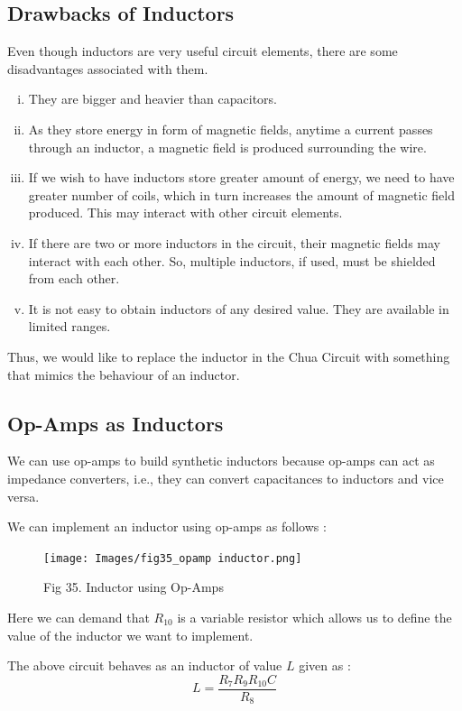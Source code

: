 \documentclass[12pt]{article}
\begin{document}
\subsection{Drawbacks of Inductors}
Even though inductors are very useful circuit elements, there are some disadvantages associated with them. 
\begin{enumerate}[i.]
	\item They are bigger and heavier than capacitors.
	\item As they store energy in form of magnetic fields, anytime a current passes through an inductor, a magnetic field is produced surrounding the wire.
	\item If we wish to have inductors store greater amount of energy, we need to have greater number of coils, which in turn increases the amount of magnetic field produced. This may interact with other circuit elements.
	\item If there are two or more inductors in the circuit, their magnetic fields may interact with each other. So, multiple inductors, if used, must be shielded from each other. 
	\item It is not easy to obtain inductors of any desired value. They are available in limited ranges.
\end{enumerate}
Thus, we would like to replace the inductor in the Chua Circuit with something that mimics the behaviour of an inductor.
\subsection{Op-Amps as Inductors}
We can use op-amps to build synthetic inductors because op-amps can act as impedance converters, i.e., they can convert capacitances to inductors and vice versa. \linebreak

We can implement an inductor using op-amps as follows :
\begin{figure}[H]
	\centering
	\texttt{[image: Images/fig35\_opamp inductor.png]}
	\caption{Fig 35. Inductor using Op-Amps}
\end{figure}
Here we can demand that $R_{10}$ is a variable resistor which allows us to define the value of the inductor we want to implement. \linebreak

The above circuit behaves as an inductor of value $L$ given as :
\begin{equation}
	L=\dfrac{R_7 R_9 R_{10} C}{R_8} \label{eq:31}
\end{equation}
\end{document}

